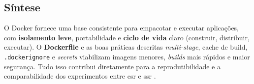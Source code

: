 \subsection{Síntese}
\label{sec:docker-sintese}

O Docker fornece uma base consistente para empacotar e executar aplicações, com \textbf{isolamento leve}, portabilidade e \textbf{ciclo de vida} claro (construir, distribuir, executar). O \textbf{Dockerfile} e as boas práticas descritas \textit{multi-stage}, cache de build, \texttt{.dockerignore} e \textit{secrets} viabilizam imagens menores, \textit{builds} mais rápidos e maior segurança. Tudo isso contribui diretamente para a reprodutibilidade e a comparabilidade dos experimentos entre \acrshort{csr} e \acrshort{ssr} \cite{docker_overview,dockerfile_ref}. 
